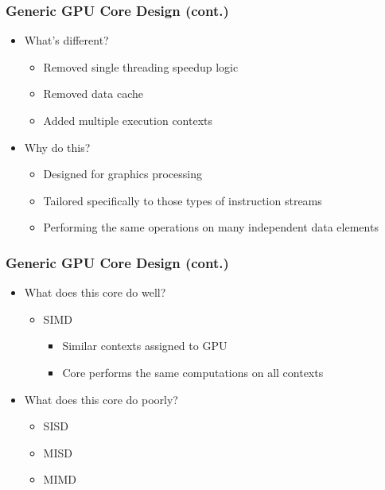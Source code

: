 \documentclass{beamer}
\begin{document}
\begin{frame}
	\frametitle{Generic GPU Core Design (cont.)}
	\begin{itemize}
		\item What's different?
		\begin{itemize}
			\item Removed single threading speedup logic
			\item Removed data cache
			\item Added multiple execution contexts
		\end{itemize}
		\item Why do this?
		\begin{itemize}
			\item Designed for graphics processing
			\item Tailored specifically to those types of instruction streams
			\item Performing the same operations on many independent data elements
		\end{itemize}
	\end{itemize}
\end{frame}

\begin{frame}
	\frametitle{Generic GPU Core Design (cont.)}
	\begin{itemize}
		\item What does this core do well?
		\begin{itemize}
			\item SIMD
			\begin{itemize}
				\item Similar contexts assigned to GPU
				\item Core performs the same computations on all contexts
			\end{itemize}
		\end{itemize}
		\item What does this core do poorly?
		\begin{itemize}
			\item SISD
			\item MISD
			\item MIMD
		\end{itemize}
	\end{itemize}
\end{frame}
\end{document}

